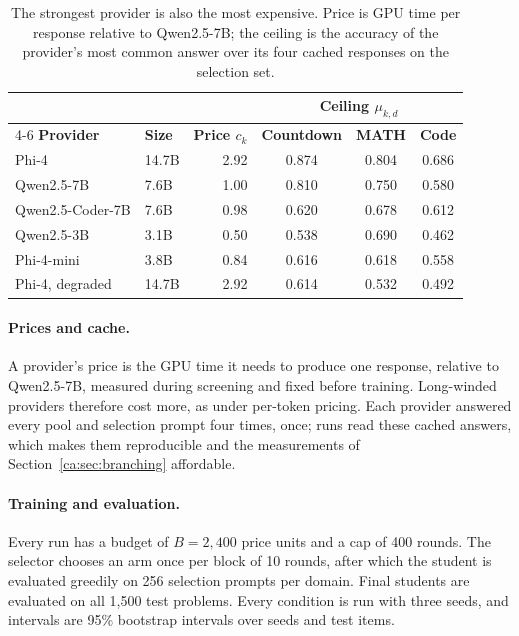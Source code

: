 \begin{table}[htbp]
\centering
\small
\begin{tabular}{@{}llrccc@{}}
\toprule
 & & & \multicolumn{3}{c}{\textbf{Ceiling $\mu_{k,d}$}} \\
\cmidrule(l){4-6}
\textbf{Provider} & \textbf{Size} & \textbf{Price $c_k$} & \textbf{Countdown} &
  \textbf{MATH} & \textbf{Code} \\
\midrule
Phi-4 \autocite{abdin_phi4_2024}                 & 14.7B & 2.92 & 0.874 & 0.804 & 0.686 \\
Qwen2.5-7B \autocite{qwen_qwen25_2024}           & 7.6B  & 1.00 & 0.810 & 0.750 & 0.580 \\
Qwen2.5-Coder-7B \autocite{hui_qwen25coder_2024} & 7.6B  & 0.98 & 0.620 & 0.678 & 0.612 \\
Qwen2.5-3B \autocite{qwen_qwen25_2024}           & 3.1B  & 0.50 & 0.538 & 0.690 & 0.462 \\
Phi-4-mini \autocite{microsoft_phi4mini_2025}    & 3.8B  & 0.84 & 0.616 & 0.618 & 0.558 \\
Phi-4, degraded                                  & 14.7B & 2.92 & 0.614 & 0.532 & 0.492 \\
\bottomrule
\end{tabular}
\caption{The strongest provider is also the most expensive. Price is GPU time per response
relative to Qwen2.5-7B; the ceiling is the accuracy of the provider's most common answer
over its four cached responses on the selection set.}
\label{ca:tab:pool}
\end{table}

\paragraph{Prices and cache.} A provider's price is the GPU time it needs to produce one
response, relative to Qwen2.5-7B, measured during screening and fixed before training.
Long-winded providers therefore cost more, as under per-token pricing. Each provider
answered every pool and selection prompt four times, once; runs read these cached answers,
which makes them reproducible and the measurements of Section~\ref{ca:sec:branching}
affordable.

\paragraph{Training and evaluation.} Every run has a budget of $B = 2{,}400$ price units
and a cap of 400 rounds. The selector chooses an arm once per block of 10 rounds, after
which the student is evaluated greedily on 256 selection prompts per domain. Final students
are evaluated on all 1,500 test problems. Every condition is run with three seeds, and
intervals are 95\% bootstrap intervals over seeds and test items.

